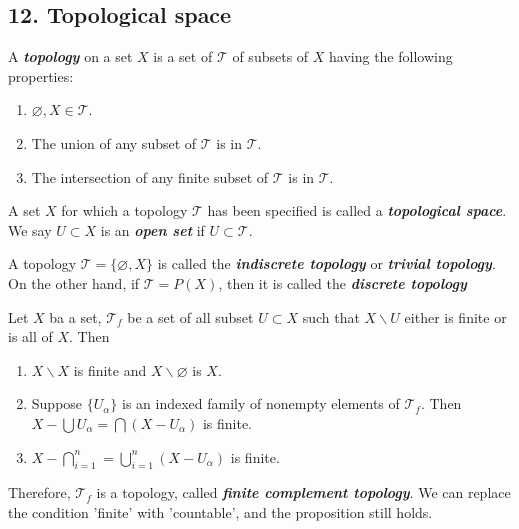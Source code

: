 \subsection{12. Topological space}

\begin{mydefinition}
[Topology]
A \textbf{\emph{topology}} on a set $X$ is a set of $\mathcal{T}$ of subsets of $X$ having the following properties:
\begin{enumerate}[label={(\alph*)}]
\item $\varnothing ,X\in \mathcal{T}$.
\item The union of any subset of $\mathcal{T}$ is in $\mathcal{T}$.
\item The intersection of any  finite subset of $\mathcal{T}$ is in $\mathcal{T}$.
\end{enumerate}
A set $X$ for which a topology $\mathcal{T}$ has been specified is called a \textbf{\emph{topological space}}. We say $U\subset X$ is an \textbf{\emph{open set}} if $U\subset \mathcal{T}$.
\end{mydefinition}
\begin{example}
A topology $\mathcal{T}=\{\varnothing, X\}$ is called the \textbf{\emph{indiscrete topology}} or \textbf{\emph{trivial topology}}. On the other hand, if $\mathcal{T}=P(X)$, then it is called the \textbf{\emph{discrete topology}}
\end{example}

\begin{example}
Let $X$ ba a set, $\mathcal{T}_f$ be a set of all subset $U\subset X$ such that $X\backslash U$ either is finite or is all of $X$. Then
\begin{enumerate}[label={(\alph*)}]
\item $X\backslash X$ is finite and $X\backslash \varnothing$ is $X$.
\item Suppose $\{U_\alpha\}$ is an indexed family of nonempty elements of $\mathcal{T}_f$. Then $X-\bigcup U_\alpha = \bigcap(X-U_\alpha)$ is finite.
\item $X-\bigcap_{i=1}^n = \bigcup_{i=1}^n(X-U_\alpha)$ is finite.
\end{enumerate}
Therefore, $\mathcal{T}_f$ is a topology, called \textbf{\emph{finite complement topology}}. We can replace the condition 'finite' with 'countable', and the proposition still holds.
\end{example}

